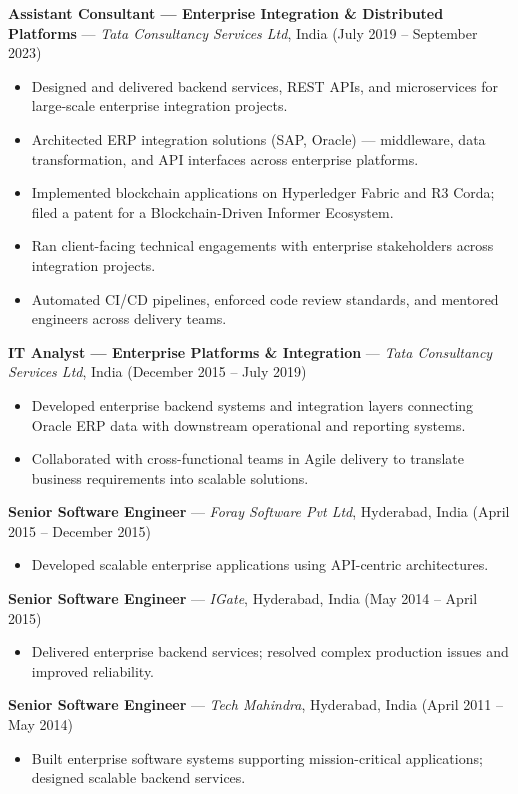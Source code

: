 \documentclass[11pt,a4paper]{article}
\newcommand{\role}[4]{%
  \noindent\textbf{#1} --- \textit{#2}, #4 (#3)\\[0.2em]
}
\begin{document}
\role{Assistant Consultant --- Enterprise Integration \& Distributed Platforms}{Tata Consultancy Services Ltd}{July 2019 -- September 2023}{India}
\begin{itemize}
  \item Designed and delivered backend services, REST APIs, and microservices for large-scale enterprise integration projects.
  \item Architected ERP integration solutions (SAP, Oracle) --- middleware, data transformation, and API interfaces across enterprise platforms.
  \item Implemented blockchain applications on Hyperledger Fabric and R3 Corda; filed a patent for a Blockchain-Driven Informer Ecosystem.
  \item Ran client-facing technical engagements with enterprise stakeholders across integration projects.
  \item Automated CI/CD pipelines, enforced code review standards, and mentored engineers across delivery teams.
\end{itemize}

\role{IT Analyst --- Enterprise Platforms \& Integration}{Tata Consultancy Services Ltd}{December 2015 -- July 2019}{India}
\begin{itemize}
  \item Developed enterprise backend systems and integration layers connecting Oracle ERP data with downstream operational and reporting systems.
  \item Collaborated with cross-functional teams in Agile delivery to translate business requirements into scalable solutions.
\end{itemize}

\role{Senior Software Engineer}{Foray Software Pvt Ltd}{April 2015 -- December 2015}{Hyderabad, India}
\begin{itemize}
  \item Developed scalable enterprise applications using API-centric architectures.
\end{itemize}

\role{Senior Software Engineer}{IGate}{May 2014 -- April 2015}{Hyderabad, India}
\begin{itemize}
  \item Delivered enterprise backend services; resolved complex production issues and improved reliability.
\end{itemize}

\role{Senior Software Engineer}{Tech Mahindra}{April 2011 -- May 2014}{Hyderabad, India}
\begin{itemize}
  \item Built enterprise software systems supporting mission-critical applications; designed scalable backend services.
\end{itemize}
\end{document}
